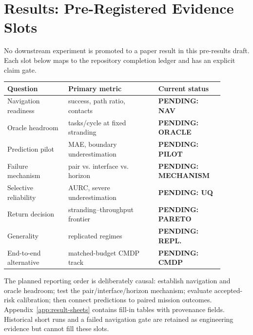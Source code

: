 \section{Results: Pre-Registered Evidence Slots}
\label{sec:results}

No downstream experiment is promoted to a paper result in this pre-results draft. Each slot below maps to the repository completion ledger and has an explicit claim gate.

\begin{center}
\centering
\small
{}
\label{tab:result-slots}
\begin{tabular}{p{0.25\linewidth}p{0.37\linewidth}p{0.26\linewidth}}
\toprule
Question & Primary metric & Current status \\
\midrule
Navigation readiness & success, path ratio, contacts & \textcolor{BrickRed}{\textbf{PENDING: NAV}} \\
Oracle headroom & tasks/cycle at fixed stranding & \textcolor{BrickRed}{\textbf{PENDING: ORACLE}} \\
Prediction pilot & MAE, boundary underestimation & \textcolor{BrickRed}{\textbf{PENDING: PILOT}} \\
Failure mechanism & pair vs. interface vs. horizon & \textcolor{BrickRed}{\textbf{PENDING: MECHANISM}} \\
Selective reliability & AURC, severe underestimation & \textcolor{BrickRed}{\textbf{PENDING: UQ}} \\
Return decision & stranding--throughput frontier & \textcolor{BrickRed}{\textbf{PENDING: PARETO}} \\
Generality & replicated regimes & \textcolor{BrickRed}{\textbf{PENDING: REPL.}} \\
End-to-end alternative & matched-budget CMDP track & \textcolor{BrickRed}{\textbf{PENDING: CMDP}} \\
\bottomrule
\end{tabular}
\end{center}

The planned reporting order is deliberately causal: establish navigation and oracle headroom; test the pair/interface/horizon mechanism; evaluate accepted-risk calibration; then connect predictions to paired mission outcomes. Appendix~\ref{app:result-sheets} contains fill-in tables with provenance fields. Historical short runs and a failed navigation gate are retained as engineering evidence but cannot fill these slots.
